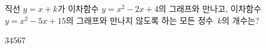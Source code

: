 직선 $y=x+k$가 이차함수 $y=x^2-2x+4$의 그래프와 만나고, 이차함수 $y=x^2-5x+15$의 그래프와 만나지 않도록 하는 모든 정수~$k$의 개수는?
\begin{choices32}{$3$}{$4$}{$5$}{$6$}{$7$}\end{choices32}
